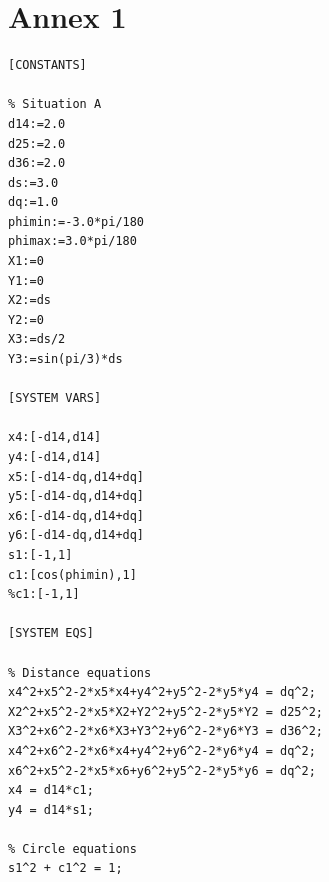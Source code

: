 \documentclass[paper=a4, fontsize=11pt]{scrartcl} %
\begin{document}
\newpage
\section{Annex 1}
\begin{verbatim}
[CONSTANTS]

% Situation A
d14:=2.0
d25:=2.0
d36:=2.0
ds:=3.0
dq:=1.0
phimin:=-3.0*pi/180
phimax:=3.0*pi/180
X1:=0
Y1:=0
X2:=ds
Y2:=0
X3:=ds/2
Y3:=sin(pi/3)*ds

[SYSTEM VARS]

x4:[-d14,d14]
y4:[-d14,d14]
x5:[-d14-dq,d14+dq]
y5:[-d14-dq,d14+dq]
x6:[-d14-dq,d14+dq]
y6:[-d14-dq,d14+dq]
s1:[-1,1]
c1:[cos(phimin),1]
%c1:[-1,1]

[SYSTEM EQS]

% Distance equations
x4^2+x5^2-2*x5*x4+y4^2+y5^2-2*y5*y4 = dq^2;
X2^2+x5^2-2*x5*X2+Y2^2+y5^2-2*y5*Y2 = d25^2;
X3^2+x6^2-2*x6*X3+Y3^2+y6^2-2*y6*Y3 = d36^2;
x4^2+x6^2-2*x6*x4+y4^2+y6^2-2*y6*y4 = dq^2;
x6^2+x5^2-2*x5*x6+y6^2+y5^2-2*y5*y6 = dq^2;
x4 = d14*c1;
y4 = d14*s1;

% Circle equations
s1^2 + c1^2 = 1;
\end{verbatim}
\end{document}

